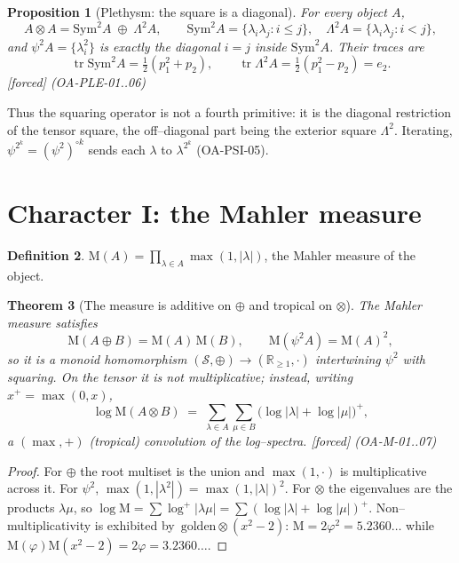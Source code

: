 \documentclass[11pt]{article}
\newcommand{\stag}[1]{{\small\textsf{\textcolor{tagcol}{[#1]}}}}
\newcommand{\bk}[1]{{\small\textsf{(#1)}}}
\theoremstyle{plain}
\newtheorem{theorem}{Theorem}[section]
\newtheorem{proposition}[theorem]{Proposition}
\theoremstyle{definition}
\newtheorem{definition}[theorem]{Definition}
\newcommand{\Sring}{\mathcal{S}}
\newcommand{\R}{\mathbb{R}}
\newcommand{\psitwo}{\psi^{2}}
\newcommand{\dsum}{\oplus}
\newcommand{\dten}{\otimes}
\newcommand{\Mahler}{\mathrm{M}}
\newcommand{\Sym}{\mathrm{Sym}}
\DeclareMathOperator{\tr}{tr}
\newcommand{\pos}[1]{{#1}^{+}}
\begin{document}
\begin{proposition}[Plethysm: the square is a diagonal]\label{prop:plethysm}
For every object $A$,
\[
A\dten A=\Sym^2 A\;\dsum\;\Lambda^2 A,\qquad
\Sym^2 A=\{\lambda_i\lambda_j: i\le j\},\quad \Lambda^2 A=\{\lambda_i\lambda_j: i<j\},
\]
and $\psitwo A=\{\lambda_i^2\}$ is exactly the diagonal $i=j$ inside $\Sym^2 A$. Their traces are
\[
\tr\Sym^2 A=\tfrac12(p_1^2+p_2),\qquad \tr\Lambda^2 A=\tfrac12(p_1^2-p_2)=e_2. 
\]
\stag{forced} \bk{OA-PLE-01..06}
\end{proposition}

\noindent Thus the squaring operator is not a fourth primitive: it is the diagonal restriction of the tensor square, the off--diagonal part being the exterior square $\Lambda^2$. Iterating, $\psi^{2^{k}}=(\psitwo)^{\circ k}$ sends each $\lambda$ to $\lambda^{2^k}$ \bk{OA-PSI-05}.

\section{Character I: the Mahler measure}\label{sec:measure}

\begin{definition}
$\Mahler(A)=\prod_{\lambda\in A}\max(1,|\lambda|)$, the Mahler measure of the object.
\end{definition}

\begin{theorem}[The measure is additive on $\dsum$ and tropical on $\dten$]\label{thm:measure}
The Mahler measure satisfies
\[
\Mahler(A\dsum B)=\Mahler(A)\,\Mahler(B),\qquad
\Mahler(\psitwo A)=\Mahler(A)^2,
\]
so it is a monoid homomorphism $(\Sring,\dsum)\to(\R_{\ge1},\cdot)$ intertwining $\psitwo$ with squaring. On the tensor it is \emph{not} multiplicative; instead, writing $\pos{x}=\max(0,x)$,
\[
\log\Mahler(A\dten B)\;=\;\sum_{\lambda\in A}\sum_{\mu\in B}\big(\log|\lambda|+\log|\mu|\big)^{+},
\]
a $(\max,+)$ (tropical) convolution of the log--spectra. \stag{forced} \bk{OA-M-01..07}
\end{theorem}

\begin{proof}
For $\dsum$ the root multiset is the union and $\max(1,\cdot)$ is multiplicative across it. For $\psitwo$, $\max(1,|\lambda^2|)=\max(1,|\lambda|)^2$. For $\dten$ the eigenvalues are the products $\lambda\mu$, so $\log\Mahler=\sum\log^+|\lambda\mu|=\sum(\log|\lambda|+\log|\mu|)^+$. Non--multiplicativity is exhibited by $\,\text{golden}\dten(x^2-2)$: $\Mahler=2\varphi^2=5.2360\ldots$ while $\Mahler(\varphi)\Mahler(x^2-2)=2\varphi=3.2360\ldots$.
\end{proof}
\end{document}
